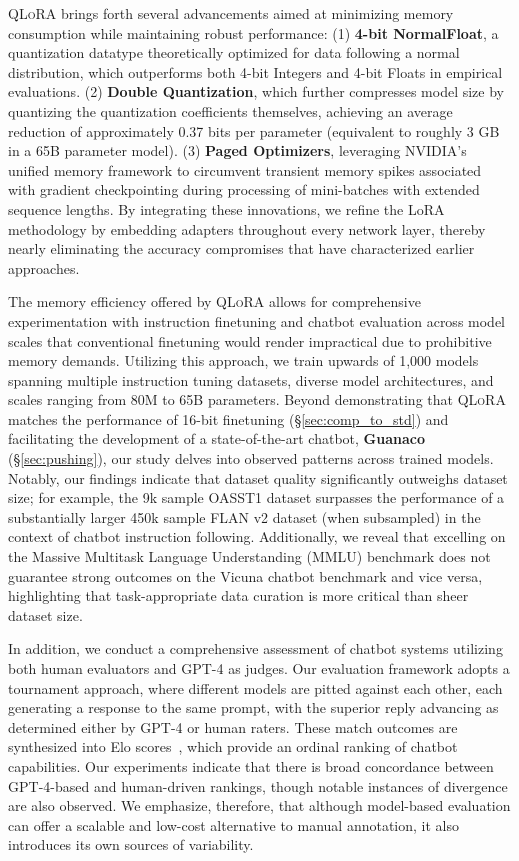 \textsc{QLoRA} brings forth several advancements aimed at minimizing memory consumption while maintaining robust performance: (1) \textbf{4-bit NormalFloat}, a quantization datatype theoretically optimized for data following a normal distribution, which outperforms both 4-bit Integers and 4-bit Floats in empirical evaluations. (2) \textbf{Double Quantization}, which further compresses model size by quantizing the quantization coefficients themselves, achieving an average reduction of approximately 0.37 bits per parameter (equivalent to roughly 3 GB in a 65B parameter model). (3) \textbf{Paged Optimizers}, leveraging NVIDIA's unified memory framework to circumvent transient memory spikes associated with gradient checkpointing during processing of mini-batches with extended sequence lengths. By integrating these innovations, we refine the LoRA methodology by embedding adapters throughout every network layer, thereby nearly eliminating the accuracy compromises that have characterized earlier approaches.

The memory efficiency offered by \textsc{QLoRA} allows for comprehensive experimentation with instruction finetuning and chatbot evaluation across model scales that conventional finetuning would render impractical due to prohibitive memory demands. Utilizing this approach, we train upwards of 1,000 models spanning multiple instruction tuning datasets, diverse model architectures, and scales ranging from 80M to 65B parameters. Beyond demonstrating that \textsc{QLoRA} matches the performance of 16-bit finetuning (\S\ref{sec:comp_to_std}) and facilitating the development of a state-of-the-art chatbot, \textbf{Guanaco} (\S\ref{sec:pushing}), our study delves into observed patterns across trained models. Notably, our findings indicate that dataset quality significantly outweighs dataset size; for example, the 9k sample OASST1 dataset surpasses the performance of a substantially larger 450k sample FLAN v2 dataset (when subsampled) in the context of chatbot instruction following. Additionally, we reveal that excelling on the Massive Multitask Language Understanding (MMLU) benchmark does not guarantee strong outcomes on the Vicuna chatbot benchmark and vice versa, highlighting that task-appropriate data curation is more critical than sheer dataset size.

In addition, we conduct a comprehensive assessment of chatbot systems utilizing both human evaluators and GPT-4 as judges. Our evaluation framework adopts a tournament approach, where different models are pitted against each other, each generating a response to the same prompt, with the superior reply advancing as determined either by GPT-4 or human raters. These match outcomes are synthesized into Elo scores~\citep{elo1967proposed, elo1978rating}, which provide an ordinal ranking of chatbot capabilities. Our experiments indicate that there is broad concordance between GPT-4-based and human-driven rankings, though notable instances of divergence are also observed. We emphasize, therefore, that although model-based evaluation can offer a scalable and low-cost alternative to manual annotation, it also introduces its own sources of variability.

